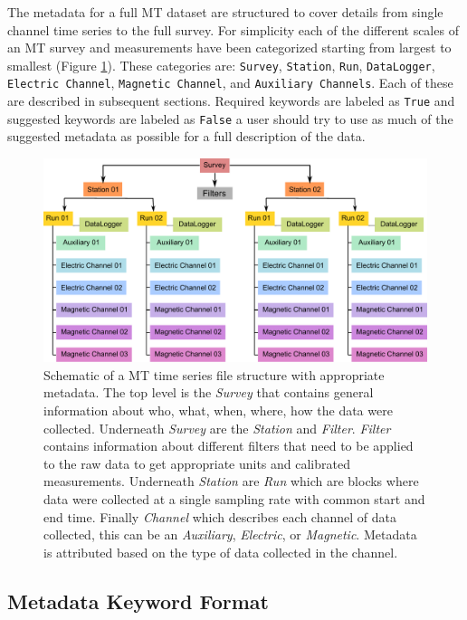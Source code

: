 \documentclass[12pt]{article}
\begin{document}
The metadata for a full MT dataset are structured to cover details from single channel time series to the full survey. For simplicity each of the different scales of an MT survey and measurements have been categorized starting from largest to smallest (Figure \ref{fig:example}). These categories are: \verb|Survey|, \verb|Station|, \verb|Run|, \verb|DataLogger|, \verb|Electric Channel|, \verb|Magnetic Channel|, and \verb|Auxiliary Channels|. Each of these are described in subsequent sections.  Required keywords are labeled as \verb|True| and suggested keywords are labeled as \verb|False| a user should try to use as much of the suggested metadata as possible for a full description of the data.  

\begin{figure}[htb!]
	\centering
	\includegraphics[height=.525\textwidth]{example_mt_file_structure.pdf}
	\caption{Schematic of a MT time series file structure with appropriate metadata. The top level is the \textit{Survey} that contains general information about who, what, when, where, how the data were collected.  Underneath \textit{Survey} are the \textit{Station} and \textit{Filter}.  \textit{Filter} contains information about different filters that need to be applied to the raw data to get appropriate units and calibrated measurements.  Underneath \textit{Station} are \textit{Run} which are blocks where data were collected at a single sampling rate with common start and end time. Finally \textit{Channel} which describes each channel of data collected, this can be an \textit{Auxiliary}, \textit{Electric}, or \textit{Magnetic}.  Metadata is attributed based on the type of data collected in the channel.}
	\label{fig:example}
\end{figure}

\subsection{Metadata Keyword Format}
\end{document}
